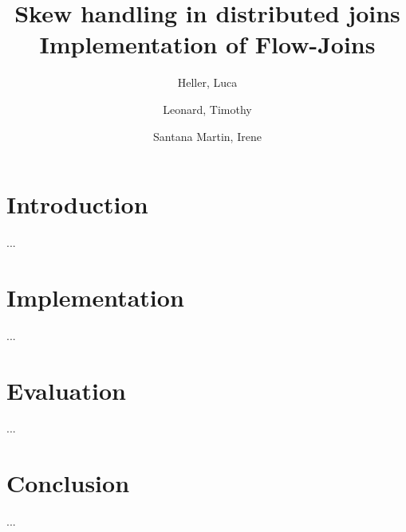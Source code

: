 \documentclass[12pt,a4paper,twocolumn]{article}
\author{
Heller, Luca\\
\and
Leonard, Timothy\\
\and
Santana Martin, Irene
}
\begin{document}
\title{
    Skew handling in distributed joins\\
    \large Implementation of Flow-Joins
}
\maketitle
{}
\section{Introduction}
...
\section{Implementation} 
...
\section{Evaluation}
...
\section{Conclusion}
...
\medskip
\printbibliography
\end{document}
